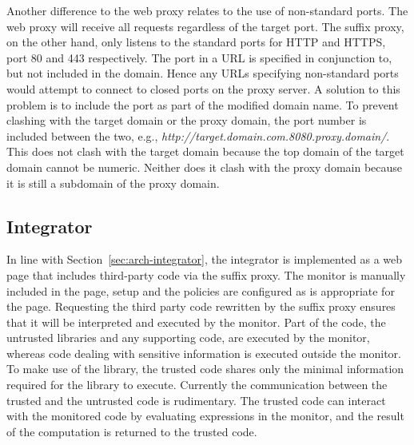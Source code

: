 \documentclass{llncs}
\newcommand{\todo}[1]{\colorbox{red}{\textcolor{white}{\sffamily\bfseries\scriptsize TODO}} \textcolor{red}{#1} \textcolor{red}{$\blacktriangleleft$}}
\begin{document}
Another difference to the web proxy relates to the use of non-standard ports.
The web proxy will receive all requests regardless of the target port. The 
suffix proxy, on the other hand, only listens to the standard ports for HTTP and HTTPS, port 80 and 
443 respectively. The port in a URL is specified in conjunction to, but not included in the domain.
Hence any URLs specifying non-standard ports would attempt to connect to closed 
ports on the proxy server. A solution to this problem is to include the port as part 
of the modified domain name. To prevent clashing with the target domain or the proxy domain, 
the port number is included between the two, e.g., \emph{http://target.domain.com.8080.proxy.domain/}.
This does not clash with the target domain because the top domain of the target domain cannot be numeric.
Neither does it clash with the proxy domain because it is still a subdomain of the proxy domain.

\subsection{Integrator}


In line with Section~\ref{sec:arch-integrator}, the integrator is implemented as 
a web page that includes third-party code via the suffix proxy. The monitor is 
manually included in the page, setup and the policies are configured as is 
appropriate for the page. Requesting the third party code rewritten by the suffix 
proxy ensures that it will be interpreted and executed by the 
monitor.
%
Part of the code, the untrusted libraries and any supporting code,
are executed by the monitor, whereas code dealing with sensitive 
information is executed outside the monitor. To make use of the library, 
the trusted code shares only the minimal information required for the 
library to execute. Currently the communication between the trusted and the 
untrusted code is rudimentary. The trusted code can interact with the monitored 
code by evaluating expressions in the monitor, and the result of the computation
is returned to the trusted code. 
\end{document}
